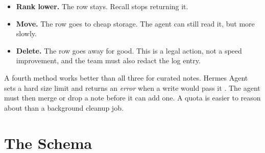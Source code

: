 \documentclass[11pt,a4paper]{article}
\begin{document}
\begin{itemize}
  \item \textbf{Rank lower.} The row stays. Recall stops returning it.
  \item \textbf{Move.} The row goes to cheap storage. The agent can still
        read it, but more slowly.
  \item \textbf{Delete.} The row goes away for good. This is a legal
        action, not a speed improvement, and the team must also redact
        the log entry.
\end{itemize}

A fourth method works better than all three for curated notes. Hermes
Agent sets a hard size limit and returns an \emph{error} when a write
would pass it \cite{hermesMemory}. The agent must then merge or drop a
note before it can add one. A quota is easier to reason about than a
background cleanup job.

\section{The Schema}
\label{sec:schema}
\end{document}
